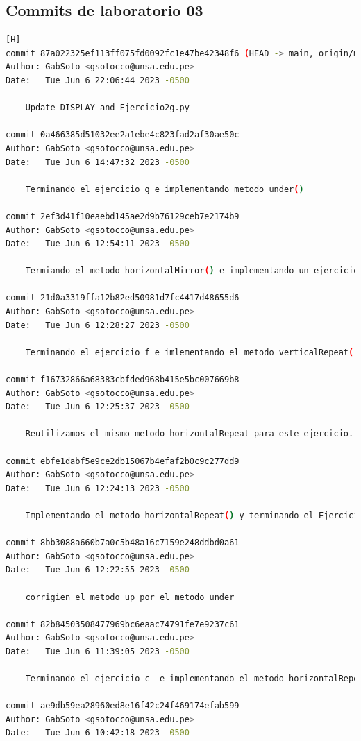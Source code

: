 \documentclass{article}
\begin{document}
\subsection{Commits de laboratorio 03}
	
\begin{lstlisting}[language=bash,caption={Commits}][H]
commit 87a022325ef113ff075fd0092fc1e47be42348f6 (HEAD -> main, origin/main)
Author: GabSoto <gsotocco@unsa.edu.pe>
Date:   Tue Jun 6 22:06:44 2023 -0500

    Update DISPLAY and Ejercicio2g.py

commit 0a466385d51032ee2a1ebe4c823fad2af30ae50c
Author: GabSoto <gsotocco@unsa.edu.pe>
Date:   Tue Jun 6 14:47:32 2023 -0500

    Terminando el ejercicio g e implementando metodo under()

commit 2ef3d41f10eaebd145ae2d9b76129ceb7e2174b9
Author: GabSoto <gsotocco@unsa.edu.pe>
Date:   Tue Jun 6 12:54:11 2023 -0500

    Termiando el metodo horizontalMirror() e implementando un ejercicio mas para mostrar su funcionalidad.

commit 21d0a3319ffa12b82ed50981d7fc4417d48655d6
Author: GabSoto <gsotocco@unsa.edu.pe>
Date:   Tue Jun 6 12:28:27 2023 -0500

    Terminando el ejercicio f e imlementando el metodo verticalRepeat()

commit f16732866a68383cbfded968b415e5bc007669b8
Author: GabSoto <gsotocco@unsa.edu.pe>
Date:   Tue Jun 6 12:25:37 2023 -0500

    Reutilizamos el mismo metodo horizontalRepeat para este ejercicio.

commit ebfe1dabf5e9ce2db15067b4efaf2b0c9c277dd9
Author: GabSoto <gsotocco@unsa.edu.pe>
Date:   Tue Jun 6 12:24:13 2023 -0500

    Implementando el metodo horizontalRepeat() y terminando el Ejercicio d

commit 8bb3088a660b7a0c5b48a16c7159e248ddbd0a61
Author: GabSoto <gsotocco@unsa.edu.pe>
Date:   Tue Jun 6 12:22:55 2023 -0500

    corrigien el metodo up por el metodo under

commit 82b84503508477969bc6eaac74791fe7e9237c61
Author: GabSoto <gsotocco@unsa.edu.pe>
Date:   Tue Jun 6 11:39:05 2023 -0500

    Terminando el ejercicio c  e implementando el metodo horizontalRepeat()

commit ae9db59ea28960ed8e16f42c24f469174efab599
Author: GabSoto <gsotocco@unsa.edu.pe>
Date:   Tue Jun 6 10:42:18 2023 -0500


\end{lstlisting}
\end{document}
